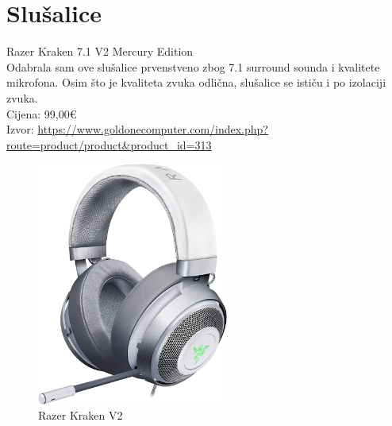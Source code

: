 \documentclass{report}
\begin{document}
\chapter{Slušalice}
Razer Kraken 7.1 V2 Mercury Edition
\\Odabrala sam ove slušalice prvenstveno zbog 7.1 surround sounda i kvalitete mikrofona. Osim što je kvaliteta zvuka odlična, slušalice se ističu i po izolaciji zvuka.
\\Cijena: 99,00€
\\Izvor:  \url{https://www.goldonecomputer.com/index.php?route=product/product&product_id=313}
\begin{figure}[h]
\includegraphics[height=8cm]{slusalice.jpg}
\caption{Razer Kraken V2}
\end{figure}
\end{document}
